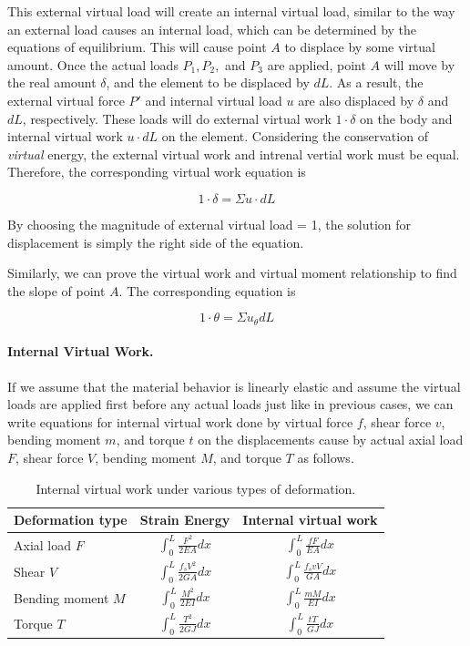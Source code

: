 \documentclass[
10pt,
a4paper,
openany,
svgnames,
]{book} %
\begin{document}
This external virtual load will create an internal virtual load, similar to the way an external load causes an internal load, which can be determined by the equations of equilibrium. This will cause point $A$ to displace by some virtual amount. Once the actual loads $P_1, P_2,$ and $P_3$ are applied, point $A$ will move by the real amount $\delta$, and the element to be displaced by $dL$. As a result, the external virtual force $P'$ and internal virtual load $u$ are also displaced by $\delta$ and $dL$, respectively. These loads will do external virtual work $1 \cdot \delta$ on the body and internal virtual work $u \cdot dL$ on the element. Considering the conservation of \emph{virtual} energy, the external virtual work and intrenal vertial work must be equal. Therefore, the corresponding virtual work equation is

\begin{equation}
  1 \cdot \delta = \Sigma u \cdot dL
\end{equation}

By choosing the magnitude of external virtual load = 1, the solution for displacement is simply the right side of the equation.

Similarly, we can prove the virtual work and virtual moment relationship to find the slope of point $A$. The corresponding equation is

\begin{equation}
  1 \cdot \theta = \Sigma u_\theta dL
\end{equation}

\paragraph{Internal Virtual Work.}

If we assume that the material behavior is linearly elastic and assume the virtual loads are applied first before any actual loads just like in previous cases, we can write equations for internal virtual work done by virtual force $f$, shear force $v$, bending moment $m$, and torque $t$ on the displacements cause by actual axial load $F$, shear force $V$, bending moment $M$, and torque $T$ as follows.

\begin{table}[h]
  \centering
  \caption{Internal virtual work under various types of deformation.}
  \begin{tabular}{l c c}
    \toprule
    Deformation type & Strain Energy & Internal virtual work \\
    \midrule
    Axial load $F$ & $\displaystyle \int_0^L \frac{F^2}{2EA} dx$ & $\displaystyle \int_0^L \frac{fF}{EA} dx $ \\[2em]
    Shear $V$ & $\displaystyle \int_0^L \frac{f_s V^2}{2GA} dx$ & $\displaystyle \int_0^L \frac{f_s vV}{GA} dx$ \\[2em]
    Bending moment $M$ & $\displaystyle \int_0^L \frac{M^2}{2EI} dx$ & $\displaystyle \int_0^L \frac{mM}{EI} dx$ \\[2em]
    Torque $T$ & $\displaystyle \int_0^L \frac{T^2}{2GJ} dx$ & $\displaystyle \int_0^L \frac{tT}{GJ} dx$ \\
    \bottomrule
  \end{tabular}
\end{table}
\end{document}
